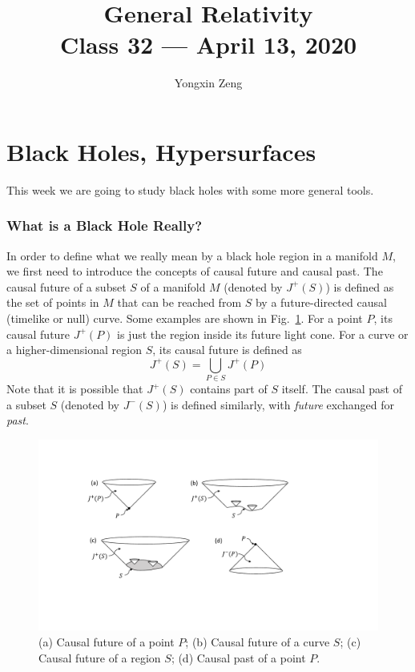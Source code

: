 \documentclass[11pt,table]{article}
\title{{\Huge General Relativity}\\{\Large{Class 32 --- April 13, 2020}}} %
\author{Yongxin Zeng}
\begin{document}
\maketitle
\flushbottom
\newpage
\pagestyle{fancynotes}

\part{Black Holes, Hypersurfaces}

This week we are going to study black holes with some more general tools.

\section{What is a Black Hole Really?}

In order to define what we really mean by a black hole region in a manifold $M$, we first need to introduce the concepts of causal future and causal past. The causal future of a subset $S$ of a manifold $M$ (denoted by $J^+(S)$) is defined as the set of points in $M$ that can be reached from $S$ by a future-directed causal (timelike or null) curve. Some examples are shown in Fig.~\ref{fig:causal_future}. For a point $P$, its causal future $J^+(P)$ is just the region inside its future light cone. For a curve or a higher-dimensional region $S$, its causal future is defined as
\begin{equation}
J^+(S) = \bigcup_{P\in S} J^+(P)
\end{equation}
Note that it is possible that $J^+(S)$ contains part of $S$ itself. The causal past of a subset $S$ (denoted by $J^-(S)$) is defined similarly, with \textit{future} exchanged for \textit{past}.

\begin{figure}[H]
\centering
\includegraphics[width=0.9\linewidth]{causal_future.pdf}
\caption{(a) Causal future of a point $P$; (b) Causal future of a curve $S$; (c) Causal future of a region $S$; (d) Causal past of a point $P$.} \label{fig:causal_future}
\end{figure}
\end{document}
